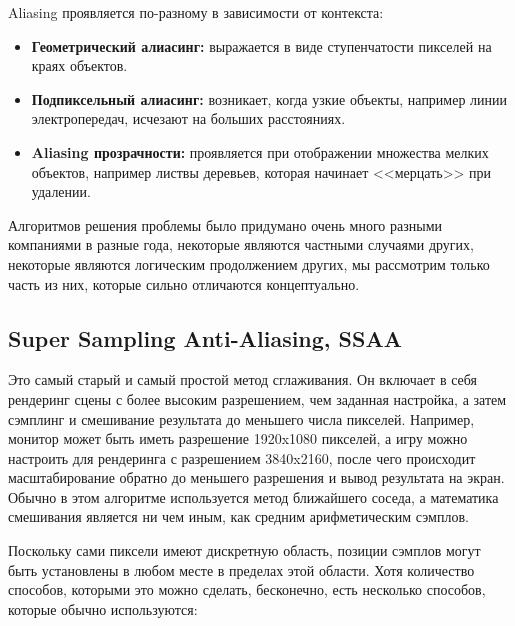 Aliasing проявляется по-разному в зависимости от контекста:

\begin{itemize}
    \item \textbf{Геометрический алиасинг:} выражается в виде ступенчатости пикселей на краях объектов.
    \item \textbf{Подпиксельный алиасинг:} возникает, когда узкие объекты, например линии электропередач, исчезают на больших расстояниях.
    \item \textbf{Aliasing прозрачности:} проявляется при отображении множества мелких объектов, например листвы деревьев, которая начинает <<мерцать>> при удалении.
\end{itemize}

Алгоритмов решения проблемы было придумано очень много разными компаниями в разные года, некоторые являются частными случаями других, некоторые являются логическим продолжением других, мы рассмотрим только часть из них, которые сильно отличаются концептуально.
\subsection{Super Sampling Anti-Aliasing, SSAA}

Это самый старый и самый простой метод сглаживания. Он включает в себя рендеринг сцены с более высоким разрешением, чем заданная настройка, а затем сэмплинг и смешивание результата до меньшего числа пикселей. Например, монитор может быть иметь разрешение 1920x1080 пикселей, а игру можно настроить для рендеринга с разрешением 3840x2160, после чего происходит масштабирование обратно до меньшего разрешения и вывод результата на экран. Обычно в этом алгоритме используется метод ближайшего соседа, а математика смешивания является ни чем иным, как средним арифметическим сэмплов.

Поскольку сами пиксели имеют дискретную область, позиции сэмплов могут быть установлены в любом месте в пределах этой области. Хотя количество способов, которыми это можно сделать, бесконечно, есть несколько способов, которые обычно используются:

